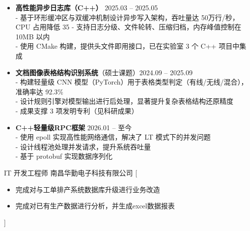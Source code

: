 \documentclass[zh]{resume}
\begin{document}
\begin{itemize}
  \item \textbf{高性能异步日志库（C++）} \hfill 2025.03 – 2025.05 \\
        - 基于环形缓冲区与双缓冲机制设计异步写入架构，吞吐量达 50万行/秒，CPU 占用降低 35%
        - 支持日志分级、文件轮转、压缩归档，内存峰值控制在 10MB 以内 \\
        - 使用 CMake 构建，提供头文件即用接口，已在实验室 3 个 C++ 项目中集成

  \item \textbf{文档图像表格结构识别系统}（硕士课题）\hfill 2024.09 – 2025.09 \\
        - 构建轻量级 CNN 模型（PyTorch）用于表格类型判定（有线/无线/混合），准确率达 92.3\% \\
        - 设计规则引擎对模型输出进行后处理，显著提升复杂表格结构还原精度 \\
        - 成果支撑 3 项发明专利（见科研成果）
  \item \textbf{C++轻量级RPC框架} \hfill 2026.01 – 至今 \\
        - 使用 epoll 实现高性能网络通信，解决了 LT 模式下的并发问题 \\
        - 设计线程池处理并发请求，提升系统吞吐量 \\
        - 基于 protobuf 实现数据序列化
\end{itemize}

\begin{experiences}
    {IT 开发工程师 \textbullet 南昌华勤电子科技有限公司}%
    [\begin{itemize}
      \item 完成对与工单排产系统数据库升级进行业务改造
      \item 完成对已有生产数据进行分析，并生成excel数据报表
    \end{itemize}]
\end{experiences}
\end{document}
